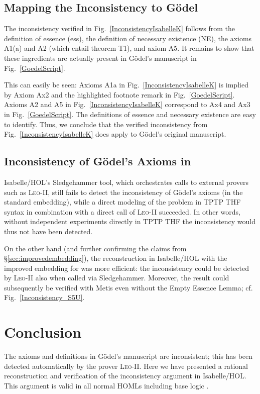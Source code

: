 \documentclass{article}
\begin{document}
\subsection{Mapping the Inconsistency to G\"odel}
The inconsistency verified in Fig.~\ref{InconsistencyIsabelleK} follows from the definition of
essence (ess), the definition of necessary existence (NE), the
axioms A1(a) and A2 (which entail theorem T1), and axiom A5. It remains to show that
these ingredients are actually present in G\"odel's manuscript in
Fig.~\ref{GoedelScript}. 


This can easily be seen: Axioms A1a in
Fig.~\ref{InconsistencyIsabelleK} is implied by Axiom Ax2 and the
highlighted footnote remark in Fig.~\ref{GoedelScript}. Axioms A2 and
A5 in Fig.~\ref{InconsistencyIsabelleK} correspond to Ax4 and Ax3 in
Fig.~\ref{GoedelScript}. The definitions of essence and necessary
existence are easy to identify. Thus, we conclude that the verified
inconsistency from Fig.~\ref{InconsistencyIsabelleK} does apply to 
G\"odel's original manuscript.

\subsection{Inconsistency of G\"odel's Axioms in \SFiveU}
Isabelle/HOL's Sledgehammer tool, which orchestrates calls to
external provers such as \textsc{Leo-II}, still
fails to detect the inconsistency of G\"odel's axioms (in the standard
embedding), while a direct modeling of the problem in TPTP THF syntax
in combination with a direct call of \textsc{Leo-II} succeeded. In
other words, without independent experiments directly in TPTP THF the
inconsistency would thus not have been detected.


On the other hand (and further confirming the claims from \S\ref{sec:improvedembedding}), 
the reconstruction in Isabelle/HOL with the improved embedding for \SFiveU was more efficient: 
the inconsistency could be detected
by \textsc{Leo-II} also when called via
Sledgehammer. Moreover, the result could subsequently be verified with
Metis even without the Empty Essence Lemma; cf. Fig.~\ref{Inconsistency_S5U}. 



\section{Conclusion}\label{sec:conclusion}
The axioms and definitions in G\"odel's manuscript are inconsistent;
this has been detected automatically by the prover
\textsc{Leo-II}. Here we have presented a rational reconstruction and
verification of the inconsistency argument in Isabelle/HOL. This
argument is valid in all normal HOMLs including base logic \K.
\end{document}
